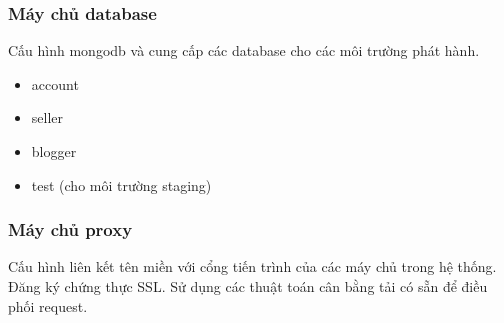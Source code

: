\subsubsection{Máy chủ database}
Cấu hình mongodb và cung cấp các database cho các môi trường phát hành.
\begin{itemize}
	\item account
	\item seller
	\item blogger
	\item test (cho môi trường staging)
\end{itemize}
\subsubsection{Máy chủ proxy}
Cấu hình liên kết tên miền với cổng tiến trình của các máy chủ trong hệ thống. Đăng ký chứng thực SSL. Sử dụng các thuật toán cân bằng tải có sẵn để điều phối request.

